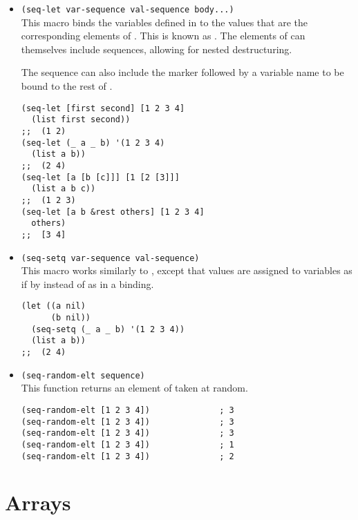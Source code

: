 \begin{itemize}
\item \lstinline|(seq-let var-sequence val-sequence body...)|\\
  This macro binds the variables defined in  to the values that are the corresponding elements of .
  This is known as .
  The elements of  can themselves include sequences, allowing for nested destructuring.

  The  sequence can also include the  marker followed by a variable name to be bound to the rest of .

\begin{lstlisting}
(seq-let [first second] [1 2 3 4]
  (list first second))
;;  (1 2)
(seq-let (_ a _ b) '(1 2 3 4)
  (list a b))
;;  (2 4)
(seq-let [a [b [c]]] [1 [2 [3]]]
  (list a b c))
;;  (1 2 3)
(seq-let [a b &rest others] [1 2 3 4]
  others)
;;  [3 4]
\end{lstlisting}

  
\item \lstinline|(seq-setq var-sequence val-sequence)|\\
  This macro works similarly to , except that values are assigned to variables as if by  instead of as in a  binding.
\begin{lstlisting}
(let ((a nil)
      (b nil))
  (seq-setq (_ a _ b) '(1 2 3 4))
  (list a b))
;;  (2 4)
\end{lstlisting}

  
\item \lstinline|(seq-random-elt sequence)|\\
  This function returns an element of  taken at random.
\begin{lstlisting}
(seq-random-elt [1 2 3 4])              ; 3
(seq-random-elt [1 2 3 4])              ; 3
(seq-random-elt [1 2 3 4])              ; 3
(seq-random-elt [1 2 3 4])              ; 1
(seq-random-elt [1 2 3 4])              ; 2
\end{lstlisting}
\end{itemize}









\section{Arrays}
\label{sec:arrays}

